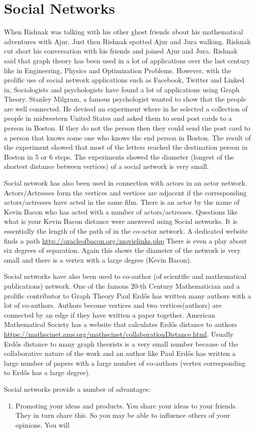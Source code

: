 \chapter{Social Networks}

When Rishnak was talking with his other ghost friends about his mathematical adventures with Ajur. Just then Rishnak spotted Ajur and Jura walking. Rishnak cut short his conversation with his friends and joined Ajur and Jura. Rishnak said that graph theory has been used in a lot of applications over the last century like in Engineering, Physics and Optimization Problems. However, with the prolific use of social network applications such as Facebook, Twitter and Linked in, Sociologists and psychologists have found a lot of applications using Graph Theory.  
Stanley Milgram, a famous psychologist wanted to show that the people are well connected. He devised an experiment where in he selected a collection of people in midwestern United States and asked them to send post cards to a person in Boston. If they do not the person then they could send the post card to a person that knows some one who knows the end person in Boston. The result of the experiment showed that most of the letters reached the destination person in Boston in 5 or 6 steps. The experiments showed the diameter (longest of the shortest distance between vertices) of a social network is very small.

Social network has also been used in connection with actors in an actor network. Actors/Actresses form the vertices and vertices are adjacent if the corresponding actors/actresses have acted in the same film. There is an actor by the name of Kevin Bacon who has acted with a number of actors/actresses. Questions like what is your Kevin Bacon distance were answered using Social networks. It is essentially the length of the path of in the co-actor network. A dedicated website finds a path \url{http://oracleofbacon.org/movielinks.php} There is even a play about six degrees of separation. Again this shows the diameter of the network is very small and there is a vertex with a large degree (Kevin Bacon).

Social networks have also been used to co-author (of scientific and mathematical publications) network. One of the famous 20-th Century Mathematician and a prolific contributor to Graph Theory Paul Erd\H{o}s has written many authors with a lot of co-authors. Authors become vertices and two vertices(authors) are connected by an edge if they have written a paper together. American Mathematical Society has a website that calculates Erd\H{o}s distance to authors
\url{https://mathscinet.ams.org/mathscinet/collaborationDistance.html}. Usually Erd\H{o}s distance to many graph theorists is a very small number because of the collaborative nature of the work and an author like Paul Erd\H{o}s has written a large number of papers with a large number of co-authors (vertex corresponding to Erd\H{o}s has a large degree).

Social networks provide a number of advantages:
\begin{enumerate}
    \item Promoting your ideas and products. You share your ideas to your friends. They in turn share this.
    So you may be able to influence others of your opinions. You will 
\end{enumerate}
